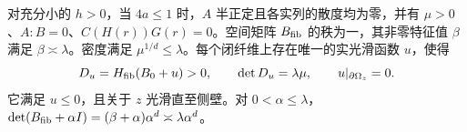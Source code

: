 对充分小的 $h>0$，当 $4a\le1$ 时，$A$ 半正定且各实列的散度均为零，并有 $\mu>0$、$A:B=0$、$C(H(r))G(r)=0$。空间矩阵 $B_{\rm fib}$ 的秩为一，其非零特征值 $\beta$ 满足 $\beta\asymp\lambda$。密度满足 $\mu^{1/d}\le\lambda$。每个闭纤维上存在唯一的实光滑函数 $u$，使得
\[
 D_u=H_{\rm fib}(B_0+u)>0,\qquad
 \det D_u=\lambda\mu,\qquad u|_{\partial\Omega_z}=0.
\]
它满足 $u\le0$，且关于 $z$ 光滑直至侧壁。对 $0<\alpha\le\lambda$，
$\det(B_{\rm fib}+\alpha I)=(\beta+\alpha)\alpha^d\asymp\lambda\alpha^d$。
